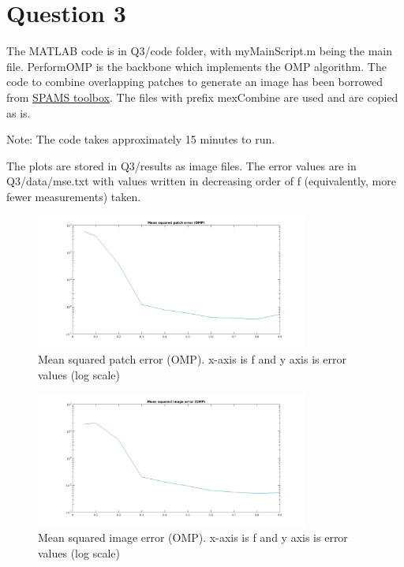 \documentclass{article}
\begin{document}
\section*{Question 3}
The MATLAB code is in Q3/code folder, with myMainScript.m being the main file. PerformOMP is the backbone which implements the OMP algorithm. The code to combine overlapping patches to generate an image has been borrowed from \href{http://spams-devel.gforge.inria.fr/}{SPAMS toolbox}. The files with prefix mexCombine are used and are copied as is.

Note: The code takes approximately 15 minutes to run.

The plots are stored in Q3/results as image files. The error values are in Q3/data/mse.txt with values written in decreasing order of f (equivalently, more fewer measurements) taken.\\

\begin{figure}[!h]
    \centering
    \includegraphics[width=0.8\textwidth]{mspe_omp}
    \caption{Mean squared patch error (OMP). x-axis is f and y axis is error values (log scale)}
\end{figure}

\begin{figure}[!h]
    \centering
    \includegraphics[width=0.8\textwidth]{msie_omp}
    \caption{Mean squared image error (OMP). x-axis is f and y axis is error values (log scale)}
\end{figure}
\end{document}
